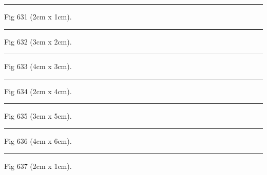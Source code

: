 \documentclass[a4paper,11pt]{article}
\begin{document}
\begin{swarmwrap}%
  \begin{minipage}[t]{2cm}
    \centering
    \rule{\linewidth}{1cm}
    {\footnotesize Fig 631 (2cm x 1cm).}
  \end{minipage}%
\end{swarmwrap}%
\swarmwrapnext
\lipsum[31]%

\begin{swarmwrap}%
  \begin{minipage}[t]{3cm}
    \centering
    \rule{\linewidth}{2cm}
    {\footnotesize Fig 632 (3cm x 2cm).}
  \end{minipage}%
\end{swarmwrap}%
\swarmwrapnext
\lipsum[32]%

\begin{swarmwrap}%
  \begin{minipage}[t]{4cm}
    \centering
    \rule{\linewidth}{3cm}
    {\footnotesize Fig 633 (4cm x 3cm).}
  \end{minipage}%
\end{swarmwrap}%
\swarmwrapnext
\lipsum[33]%

\begin{swarmwrap}%
  \begin{minipage}[t]{2cm}
    \centering
    \rule{\linewidth}{4cm}
    {\footnotesize Fig 634 (2cm x 4cm).}
  \end{minipage}%
\end{swarmwrap}%
\swarmwrapnext
\lipsum[34]%

\begin{swarmwrap}%
  \begin{minipage}[t]{3cm}
    \centering
    \rule{\linewidth}{5cm}
    {\footnotesize Fig 635 (3cm x 5cm).}
  \end{minipage}%
\end{swarmwrap}%
\swarmwrapnext
\lipsum[35]%

\begin{swarmwrap}%
  \begin{minipage}[t]{4cm}
    \centering
    \rule{\linewidth}{6cm}
    {\footnotesize Fig 636 (4cm x 6cm).}
  \end{minipage}%
\end{swarmwrap}%
\swarmwrapnext
\lipsum[36]%

\begin{swarmwrap}%
  \begin{minipage}[t]{2cm}
    \centering
    \rule{\linewidth}{1cm}
    {\footnotesize Fig 637 (2cm x 1cm).}
  \end{minipage}%
\end{swarmwrap}%
\swarmwrapnext
\lipsum[37]%
\end{document}
